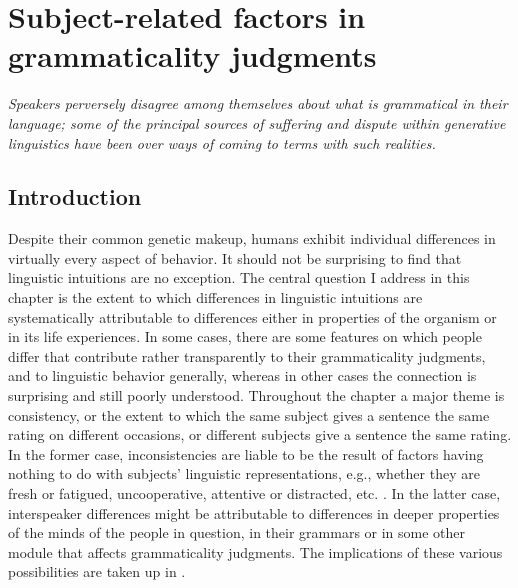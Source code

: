 \chapter{Subject-related factors in grammaticality judgments}\label{sec:4}

\epigraph{\itshape Speakers perversely  disagree among themselves about what is grammatical in their language; some of the principal  sources of suffering and dispute within generative  linguistics have been over ways of coming to terms with such realities.\\[-2\baselineskip]}{\citep{Fillmore1979}}

\section{Introduction}\label{sec:4.1}

Despite their common genetic makeup, humans exhibit individual differences in virtually every aspect of behavior. It should not be surprising to find that linguistic intuitions are no exception. The central question I address in this chapter is the extent to which differences in linguistic intuitions are systematically attributable to differences either in properties of the organism or in its life experiences. In some cases, there are some features on which people differ that contribute rather transparently to their grammaticality judgments, and to linguistic behavior generally, whereas in other cases the connection is surprising and still poorly understood. Throughout the chapter a major theme is consistency, or the extent to which the same subject gives a sentence the same rating on different occasions, or different subjects give a sentence the same rating. In the former case, inconsistencies are liable to be the result of factors having nothing to do with subjects' linguistic representations, e.g., whether they are fresh or fatigued, uncooperative, attentive or distracted, etc. \citep{BradacEtAl1980}. In the latter case, interspeaker differences might be attributable to differences in deeper properties of the minds of the people in question, in their grammars or in some other module that affects grammaticality judgments. The implications of these various possibilities are taken up in .



